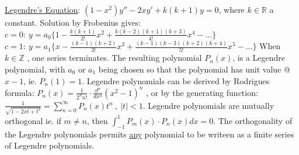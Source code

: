 \documentclass[12pt]{article}
\begin{document}
\begin{flushleft}
	\uline{Legendre's Equation}: $\displaystyle (1-x^2)y'' -2xy' +k(k+1)y =0$, \linebreak 
	where $k \in \mathbb{R}$ a constant. Solution by Frobenius gives: \linebreak 
	$\displaystyle  c= 0: \ y = a_0 \big\{ 1 - \frac{k(k+1)}{2!} x^2 + \frac{k(k-2)(k+1)(k+3)}{4!} x^4 - \ldots \big\} $ \linebreak 
	$\displaystyle c=1: \ y = a_1 \big\{ x- \frac{(k-1)(k+2)}{3!} x^3 + \frac{(k-1)(k-3)(k+2)(k+4)}{5!} x^5 - \ldots \big\} $ \linebreak 
	When $k\in \mathbb{Z}$ , one series terminates. The resulting polynomial $P_n(x)$, is a Legendre polynomial, with $a_0$ or $a_1$ being chosen so that the polynomial has unit value @$x-1$, ie. $P_n (1) = 1$. \linebreak 
	\textbullet \quad Legendre polynomials can be derived by Rodrigues formula: \linebreak 
	$\displaystyle P_n(x) = \frac{1}{2^n n!} \cdot \frac{d^n}{dx^n} (x^2 -1)^n $ , \linebreak 
	or by the generating function: $\displaystyle \frac{1}{\sqrt{1-2xt+t^2}} = \sum \limits_{n=0}^{\infty} P_n (x) t^n \ , \ |t| < 1$. \linebreak 
	\textbullet \quad Legendre polynomials are mutually orthogonal ie. if $m \neq n$, then $\int_{-1}^1 P_m (x) \cdot P_n (x) dx = 0$. The orthogonality of the Legendre polynomials permits \uline{any} polynomial to be writeen as a finite series of Legendre polynomials. \linebreak 
	

\end{flushleft}
\end{document}
